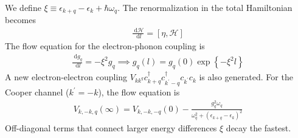 We define \(\xi \equiv \epsilon_{k+q} - \epsilon_k + \hbar\omega_q\). The renormalization in the total Hamiltonian becomes
\begin{equation}\begin{aligned}
	\frac{\:\mathrm{d}\mathcal{H}}{\:\mathrm{d}l} = \left[\eta,\mathcal{H}\right]
\end{aligned}\end{equation}
The flow equation for the electron-phonon coupling is
\begin{equation}\begin{aligned}
	\frac{\:\mathrm{d}g_q}{\:\mathrm{d}l} = -\xi^2g_q \implies g_q(l) = g_q(0)\exp\left\{-\xi^2 l\right\} 
\end{aligned}\end{equation}
A new electron-electron coupling \(V_{kk^ q}c^\dagger_{k+q}c^\dagger_{k^\prime -q}c_{k^\prime}c_k\) is also generated. For the Cooper channel (\(k^\prime = -k\)), the flow equation is
\begin{equation}\begin{aligned}
	V_{k,-k,q}(\infty) = V_{k,-k,-q}(0) - \frac{g_q^2\omega_q}{\omega_q^2 + \left(\epsilon_{k+q} - \epsilon_k\right)^2}
\end{aligned}\end{equation}
Off-diagonal terms that connect larger energy differences \(\xi\) decay the fastest.
